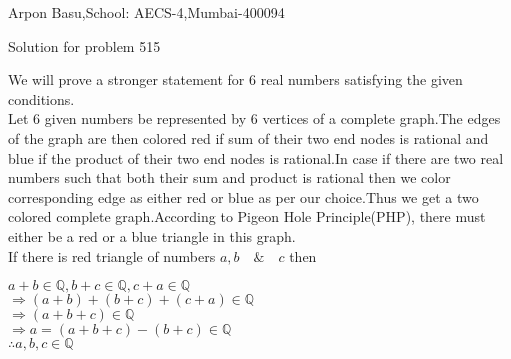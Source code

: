 \documentclass[a4paper,10pt]{article}
\begin{document}
\begin{center}


Arpon Basu,School: AECS-4,Mumbai-400094

Solution for problem 515
\end{center}

  We will prove a stronger statement for $6$ real numbers satisfying the given conditions.\\
Let $6$ given numbers be represented by $6$ vertices of a complete graph.The edges of the graph are then colored red if sum of their two end nodes
is rational and blue if the product of their two end nodes is rational.In case if there are two real numbers such that both their sum and product is rational then we color corresponding edge as either red or
blue as per our choice.Thus we get a two colored complete graph.According to Pigeon Hole Principle(PHP), there must either be a red or a blue triangle
in this graph.\\
If there is red triangle of numbers $a,b\quad \textrm{\&}\quad  c$ then \\

\begin{center}
$ a+b \in \mathbb{Q} , b+c \in \mathbb{Q} , c+a \in \mathbb{Q} $ \\
$\Rightarrow (a+b)+(b+c)+(c+a)\in \mathbb{Q} $ \\
$\Rightarrow (a+b+c)\in \mathbb{Q} $ \\
$\Rightarrow a=(a+b+c)-(b+c)\in \mathbb{Q} $ \\  
$\therefore a,b,c \in \mathbb{Q} $  
\end{center}
\end{document}
